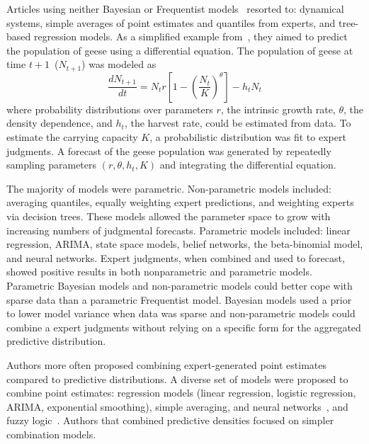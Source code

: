 \documentclass[preprint,authoryear,nonatbib]{elsarticle}
\def\l{\left}
\def\r{\right}
\newcommand{\f}{\frac}
\begin{document}
Articles using neither Bayesian or Frequentist models~\parencite{johnson2018making,li2012preliminary,petrovic2006fuzzy,song2013combining,graefe2014accuracy,morgan2014use,cai2016simple,kabak2008aggregating,graefe2015accuracy,graefe2018predicting,failing2004using,ren2002optimal,hora2013median,baron2014two} resorted to: dynamical systems, simple averages of point estimates and quantiles from experts, and tree-based regression models.
As a simplified example from~\parencite{johnson2018making}, they aimed to predict the population of geese using a differential equation.
The population of geese at time $t+1$~($N_{t+1}$) was modeled as
\begin{equation*}
  \f{d N_{t+1}}{dt} = N_{t}r\l[ 1 - \l(\f{N_{t}}{K}\r)^{\theta} \r] - h_{t}N_{t}
\end{equation*}
where probability distributions over parameters $r$, the intrinsic growth rate, $\theta$, the density dependence, and $h_{t}$, the harvest rate, could be estimated from data.
To estimate the carrying capacity $K$, a probabilistic distribution was fit to expert judgments.
A forecast of the geese population was generated by repeatedly sampling parameters $(r,\theta,h_{t},K)$ and integrating the differential equation.

The majority of models were parametric.
Non-parametric models included: averaging quantiles, equally weighting expert predictions, and weighting experts via decision trees.
These models allowed the parameter space to grow with increasing numbers of judgmental forecasts.
Parametric models included: linear regression, ARIMA, state space models, belief networks, the beta-binomial model, and neural networks.
Expert judgments, when combined and used to forecast, showed positive results in both nonparametric and parametric models.
Parametric Bayesian models and non-parametric models could better cope with sparse data than a parametric Frequentist model.
Bayesian models used a prior to lower model variance when data was sparse and non-parametric models could combine a expert judgments without relying on a specific form for the aggregated predictive distribution.

Authors more often proposed combining expert-generated point estimates compared to predictive distributions.
A diverse set of models were proposed to combine point estimates: regression models (linear regression, logistic regression, ARIMA, exponential smoothing), simple averaging, and neural networks~\parencite{cabello2012combination,adams2009acceptability,mak1996aggregating,graefe2014combining,baron2014two}, and fuzzy logic~\parencite{petrovic2006fuzzy,kabak2008aggregating,jana2019interval,ren2002optimal}.
Authors that combined predictive densities focused on simpler combination models.
\end{document}
